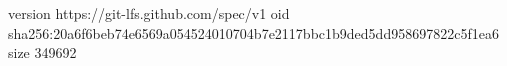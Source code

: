 version https://git-lfs.github.com/spec/v1
oid sha256:20a6f6beb74e6569a054524010704b7e2117bbc1b9ded5dd958697822c5f1ea6
size 349692
